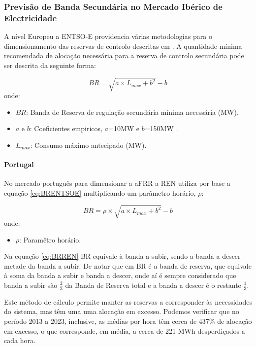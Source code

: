 \subsubsection{Previsão de Banda Secundária no Mercado Ibérico de Electricidade \label{se:pred_mibel}}
A nível Europeu a \gls{ENTSO-E} providencia várias metodologias para o dimensionamento das reservas de controlo descritas em \cite{handbook2009policy}. A quantidade mínima recomendada de alocação necessária para a reserva de controlo secundária pode ser descrita da seguinte forma:\par

\begin{equation} \label{eq:BRENTSOE} 
    BR = \sqrt{a \times  L_{max} + b^{2}} - b 
\end{equation}
onde:
\begin{itemize}
  \item $BR$: Banda de Reserva de regulação secundária mínima necessária (MW).
  \item $a$ e $b$: Coeficientes empiricos, $a$=10MW e $b$=150MW .
  \item $L_{max}$: Consumo máximo antecipado (MW).
\end{itemize}


\paragraph{Portugal \label{se:prev_portugal}}
\text{ }  \par

No mercado português para dimensionar a \gls{aFRR} a \gls{REN} utiliza por base a equação \ref{eq:BRENTSOE} multiplicando um parâmetro horário, $\rho$:

\begin{equation} \label{eq:BRREN} 
    BR = \rho \times \sqrt{a \times  L_{max} + b^{2}} - b 
\end{equation}
onde:
\begin{itemize}
  \item $\rho$: Paramêtro horário.
\end{itemize}


Na equação \ref{eq:BRREN} BR equivale à banda a subir, sendo a banda a descer metade da banda a subir. De notar que em \cite{Carneiro2016} BR é a banda de reserva, que equivale à soma da banda a subir e banda a descer, onde aí é sempre considerado que banda a subir são $\frac{2}{3}$ da Banda de Reserva total e a banda a descer é o restante $\frac{1}{3}$.\par
Este método de cálculo permite manter as reservas a corresponder às necessidades do sistema, mas têm uma uma alocação  em excesso. Podemos verificar que no período 2013 a 2023, inclusive, as médias por hora têm cerca de 437\% de alocação em excesso, o que corresponde, em média, a cerca de 221 MWh desperdiçados a cada hora. \par

